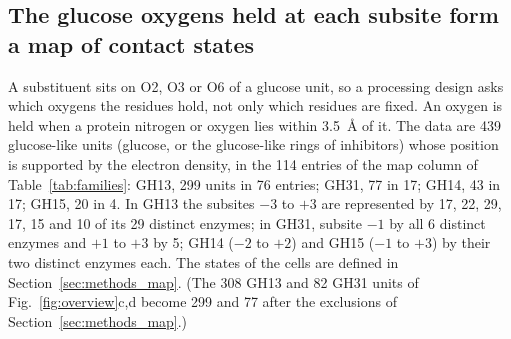 \documentclass[preprint,12pt]{elsarticle}
\begin{document}
\begin{table}[htbp]
\par\smallskip{}
\end{table}

\subsection{The glucose oxygens held at each subsite form a map of contact states}\label{sec:map}

A substituent sits on O2, O3 or O6 of a glucose unit, so a processing design asks which oxygens the residues hold,
not only which residues are fixed. An oxygen is held when a protein nitrogen or oxygen lies within 3.5~\AA{} of it. The data are 439 glucose-like units (glucose, or the glucose-like rings of inhibitors) whose position is supported by the electron density, in the 114 entries of the map column of Table~\ref{tab:families}: GH13, 299
units in 76 entries; GH31, 77 in 17; GH14, 43 in 17; GH15, 20 in 4. In GH13 the subsites $-3$ to $+3$ are represented
by 17, 22, 29, 17, 15 and 10 of its 29 distinct enzymes; in GH31, subsite $-1$ by all 6 distinct enzymes and $+1$ to $+3$ by 5; GH14 ($-2$ to
$+2$) and GH15 ($-1$ to $+3$) by their two distinct enzymes each. The states of the cells are defined in Section~\ref{sec:methods_map}. (The 308 GH13 and 82 GH31 units of Fig.~\ref{fig:overview}c,d
become 299 and 77 after the exclusions of Section~\ref{sec:methods_map}.)
\end{document}
